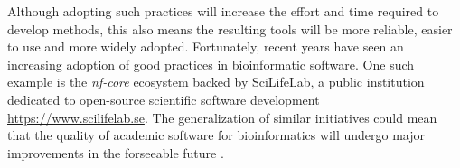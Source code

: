 Although adopting such practices will increase the effort and time required to develop methods, this also means the resulting tools will be more reliable, easier to use and more widely adopted. Fortunately, recent years have seen an increasing adoption of good practices in bioinformatic software. One such example is the \textit{nf-core} ecosystem backed by SciLifeLab, a public institution dedicated to open-source scientific software development \url{https://www.scilifelab.se}. The generalization of similar initiatives could mean that the quality of academic software for bioinformatics will undergo major improvements in the forseeable future \cite{ewelsNfcoreFrameworkCommunitycurated2020,wrattenReproducibleScalableShareable2021}.